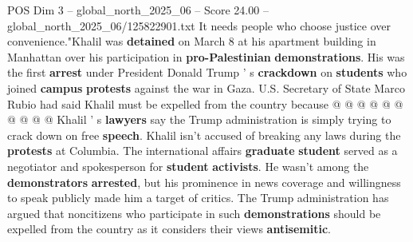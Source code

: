 \begin{textsample}{POS Dim 3 – global\_north\_2025\_06 – Score 24.00 – global\_north\_2025\_06/125822901.txt}
It needs people who choose justice over convenience."Khalil was \textbf{detained} on March 8 at his apartment building in Manhattan over his participation in \textbf{pro-Palestinian} \textbf{demonstrations}.
His was the first \textbf{arrest} under President Donald Trump ' s \textbf{crackdown} on \textbf{students} who joined \textbf{campus} \textbf{protests} against the war in Gaza.
U.S.
Secretary of State Marco Rubio had said Khalil must be expelled from the country because @ @ @ @ @ @ @ @ @ @ Khalil ' s \textbf{lawyers} say the Trump administration is simply trying to crack down on free \textbf{speech}.
Khalil isn't accused of breaking any laws during the \textbf{protests} at Columbia.
The international affairs \textbf{graduate} \textbf{student} served as a negotiator and spokesperson for \textbf{student} \textbf{activists}.
He wasn't among the \textbf{demonstrators} \textbf{arrested}, but his prominence in news coverage and willingness to speak publicly made him a target of critics.
The Trump administration has argued that noncitizens who participate in such \textbf{demonstrations} should be expelled from the country as it considers their views \textbf{antisemitic}.

\end{textsample}
